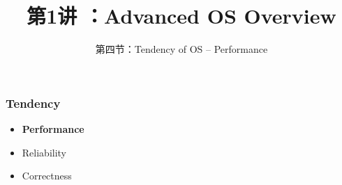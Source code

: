 


\title[第1讲]{第1讲 ：Advanced OS Overview} %
\subtitle{第四节：Tendency of OS -- Performance}
\date{}



\begin{frame}
\titlepage %
\end{frame}

%
%
\begin{frame}[plain]
	\frametitle{Tendency}

	\begin{itemize}\huge
	\item \textbf{Performance}
	\item Reliability
	\item Correctness
	
\end{itemize}
\end{frame}


